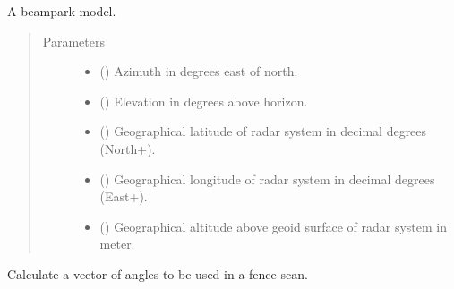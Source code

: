 \documentclass[letterpaper,10pt,english]{sphinxmanual}
\begin{document}
\begin{fulllineitems}
\label{\detokenize{modules/radar_scan_library:radar_scan_library.beampark_model}}
A beampark model.
\begin{quote}\begin{description}
\item[{Parameters}] \leavevmode\begin{itemize}
\item {} 
 () \textendash{} Azimuth in degrees east of north.

\item {} 
 () \textendash{} Elevation in degrees above horizon.

\item {} 
 () \textendash{} Geographical latitude of radar system in decimal degrees  (North+).

\item {} 
 () \textendash{} Geographical longitude of radar system in decimal degrees (East+).

\item {} 
 () \textendash{} Geographical altitude above geoid surface of radar system in meter.

\end{itemize}

\end{description}\end{quote}

\end{fulllineitems}


\begin{fulllineitems}
\label{\detokenize{modules/radar_scan_library:radar_scan_library.calculate_fence_angles}}
Calculate a vector of angles to be used in a fence scan.

\end{fulllineitems}
\end{document}
